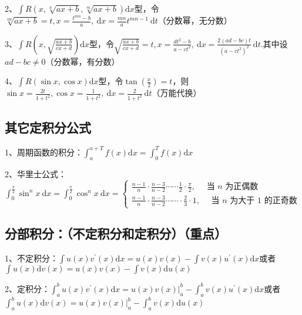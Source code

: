 2、$\int R(x, \sqrt[n]{a x+b}, \sqrt[m]{a x+b}) \mathrm{d} x$型，令$\sqrt[n n]{a x+b}=t, x=\frac{t^{m n}-b}{a}, \mathrm{~d} x=\frac{m n}{a} t^{m n-1} \mathrm{~d} t$（分数幂，无分数）

3、$\int R\left(x, \sqrt{\frac{a x+b}{c x+d}}\right) \mathrm{d} x$型，令$\sqrt{\frac{a x+b}{c x+d}}=t, x=\frac{d t^{2}-b}{a-c t^{2}}, \mathrm{~d} x=\frac{2(a d-b c) t}{\left(a-c t^{2}\right)^{2}} \mathrm{~d} t .$其中设$a d-b c \neq 0$（分数幂，有分数）

4、$\int R(\sin x, \cos x) \mathrm{d} x$型，令$\tan({\frac{x}{2}})=t$，则$\sin x=\frac{2 t}{1+t^{2}}, \cos x=\frac{1}{1+t^{2}}, \mathrm{~d} x=\frac{2}{1+t^{2}} \mathrm{~d} t$（万能代换）



\subsection{其它定积分公式}

1、周期函数的积分：$\int_{a}^{a+T} f(x) \mathrm{d} x=\int_{0}^{T} f(x) \mathrm{d} x$

2、华里士公式：$\int_{0}^{\frac{\pi}{2}} \sin ^{n} x \mathrm{~d} x=\int_{0}^{\frac{\pi}{2}} \cos ^{n} x \mathrm{~d} x=\left\{\begin{array}{l}\frac{n-1}{n} \cdot \frac{n-3}{n-2} \cdots \cdots \frac{1}{2} \cdot \frac{\pi}{2}, \quad \text { 当 } n \text { 为正偶数 } \\\frac{n-1}{n} \cdot \frac{n-3}{n-2} \cdots \cdots \cdot \frac{2}{3} \cdot 1, \quad \text { 当 } n \text { 为大于 } 1 \text { 的正奇数 }\end{array}\right.$



\subsection{分部积分：（不定积分和定积分）（重点）}

1、不定积分：$\int u(x) v^{\prime}(x) \mathrm{d} x=u(x) v(x)-\int v(x) u^{\prime}(x) \mathrm{d} x$或者$\int u(x) \mathrm{d} v(x)=u(x) v(x)-\int v(x) \mathrm{d} u(x)$

2、定积分：$\int_{a}^{b} u(x) v^{\prime}(x) \mathrm{d} x=\left.u(x) v(x)\right|_{a} ^{b}-\int_{a}^{b} v(x) u^{\prime}(x) \mathrm{d} x$或者$\int_{a}^{b} u(x) \mathrm{d} v(x)=\left.u(x) v(x)\right|_{a} ^{b}-\int_{a}^{b} v(x) \mathrm{d} u(x)$



